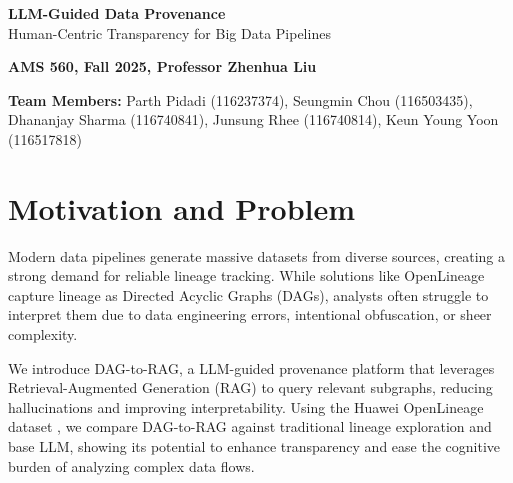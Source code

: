 \documentclass[9pt,letterpaper]{article}
\begin{document}
\begin{center}
    {\LARGE\bfseries\color{primaryblue} LLM-Guided Data Provenance}\\[0.2cm]
    {\Large\color{secondaryblue} Human-Centric Transparency for Big Data Pipelines}\\[0.4cm]

    \begin{tcolorbox}[colback=lightgray,colframe=primaryblue,width=0.9\textwidth,arc=2mm,boxsep=3pt]
        \centering
        {\large\bfseries AMS 560, Fall 2025, Professor Zhenhua Liu}
    \end{tcolorbox}

    {\small\bfseries Team Members:} Parth Pidadi (116237374), Seungmin Chou (116503435), Dhananjay Sharma (116740841), Junsung Rhee (116740814), Keun Young Yoon (116517818)
\end{center}


\section{Motivation and Problem}

Modern data pipelines generate massive datasets from diverse sources, creating a strong demand for reliable lineage tracking. While solutions like OpenLineage capture lineage as Directed Acyclic Graphs (DAGs), analysts often struggle to interpret them due to data engineering errors, intentional obfuscation, or sheer complexity.

We introduce DAG-to-RAG, a LLM-guided provenance platform that leverages Retrieval-Augmented Generation (RAG) to query relevant subgraphs, reducing hallucinations and improving interpretability. Using the Huawei OpenLineage dataset \cite{CHEN20241}, we compare DAG-to-RAG against traditional lineage exploration and base LLM, showing its potential to enhance transparency and ease the cognitive burden of analyzing complex data flows.

\end{document}
